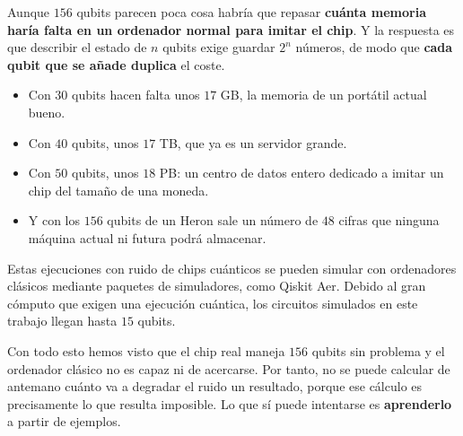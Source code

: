Aunque $156$ qubits parecen poca cosa habría que repasar \textbf{cuánta memoria haría falta en un ordenador normal
para imitar el chip}. Y la respuesta es que describir el estado de $n$ qubits exige guardar
$2^n$ números, de modo que \textbf{cada qubit que se añade duplica} el coste. 
\begin{itemize}
    \item Con $30$ qubits hacen falta unos $17$ GB, la memoria de un portátil actual bueno.
    \item  Con $40$ qubits, unos $17$ TB, que ya es un servidor grande.
    \item Con $50$ qubits, unos $18$ PB: un centro de datos entero dedicado a imitar un chip del tamaño de una moneda. 
    \item Y con los $156$ qubits de un Heron sale un número de $48$ cifras que ninguna máquina actual ni futura podrá almacenar.
\end{itemize}

Estas ejecuciones con ruido de chips cuánticos se pueden simular con ordenadores clásicos mediante paquetes de 
simuladores, como Qiskit Aer. Debido al gran cómputo que exigen una ejecución cuántica, los 
circuitos simulados en este trabajo llegan hasta $15$ qubits.

Con todo esto hemos visto que el chip real maneja $156$ qubits sin problema y el ordenador clásico no es capaz
ni de acercarse. Por tanto, no se puede calcular de antemano cuánto va a degradar
el ruido un resultado, porque ese cálculo es precisamente lo que resulta imposible. Lo
que sí puede intentarse es \textbf{aprenderlo} a partir de ejemplos.



